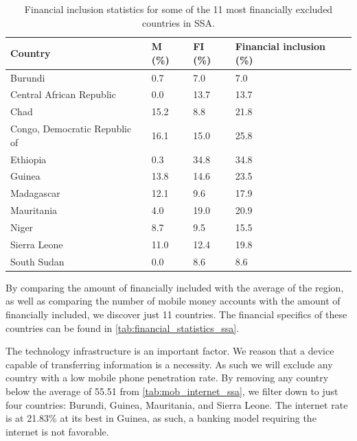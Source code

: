 \documentclass[11pt, a4paper]{article}
\begin{document}
\begin{table}[!ht]
\centering
\begin{tabular}{|l|l|l|l|}
\hline
\textbf{Country}        & \textbf{M (\%)} & \textbf{FI (\%)} & \textbf{Financial inclusion (\%)} \\ \hline
Burundi             & 0.7            & 7.0                      & 7.0                  \\ \hline
Central African Republic    & 0.0            & 13.7                       & 13.7                  \\ \hline
Chad              & 15.2             & 8.8                      & 21.8                 \\ \hline
Congo, Democratic Republic of & 16.1             & 15.0                       & 25.8                  \\ \hline
Ethiopia            & 0.3            & 34.8                       & 34.8                  \\ \hline
Guinea            & 13.8             & 14.6                       & 23.5                  \\ \hline
Madagascar          & 12.1             & 9.6                      & 17.9                  \\ \hline
Mauritania          & 4.0            & 19.0                       & 20.9                  \\ \hline
Niger             & 8.7            & 9.5                      & 15.5                  \\ \hline
Sierra Leone          & 11.0             & 12.4                       & 19.8                  \\ \hline
South Sudan           & 0.0            & 8.6                      & 8.6                  \\ \hline
\end{tabular}
\caption{Financial inclusion statistics for some of the 11 most financially excluded countries in SSA\cite{gfindex}.}
\label{tab:financial_statistics_ssa}
\end{table}
By comparing the amount of financially included with the average of the region, as well as comparing the number of mobile money accounts with the amount of financially included, we discover just 11 countries. The financial specifics of these countries can be found in \autoref{tab:financial_statistics_ssa}.


The technology infrastructure is an important factor. We reason that a device capable of transferring information is a necessity. As such we will exclude any country with a low mobile phone penetration rate. By removing any country below the average of 55.51 from \autoref{tab:mob_internet_ssa}, we filter down to just four countries: Burundi, Guinea, Mauritania, and Sierra Leone. The internet rate is at 21.83\% at its best in Guinea, as such, a banking model requiring the internet is not favorable.
\end{document}
